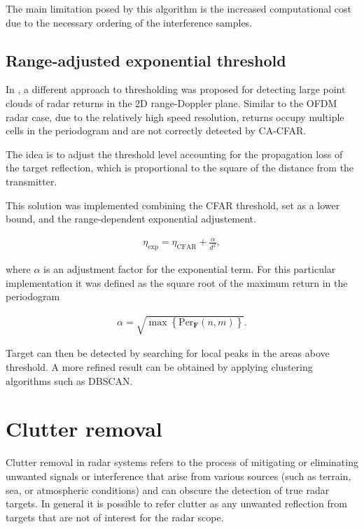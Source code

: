 The main limitation posed by this algorithm is the increased computational cost due to the necessary ordering of the interference samples.


\subsection{Range-adjusted exponential threshold}

	
	In \cite{Wagner_Feger_Stelzer_2017}, a different approach to thresholding was proposed for detecting large point clouds of radar returns in the 2D range-Doppler plane. Similar to the OFDM radar case, due to the relatively high speed resolution, returns occupy multiple cells in the periodogram and are not correctly detected by CA-CFAR.
	
	The idea is to adjust the threshold level accounting for the propagation loss of the target reflection, which is proportional to the square of the distance from the transmitter. 
	
	This solution was implemented combining the CFAR threshold, set as a lower bound, and the range-dependent exponential adjustement.
	
	\begin{align}
		\eta_{\text{exp}} = \eta_{\text{CFAR}} + \frac{\alpha}{d^2},
	\end{align} 
	
	where $\alpha$ is an adjustment factor for the exponential term. For this particular implementation it was defined as the square root of the maximum return in the periodogram
	
	\begin{align}
		\alpha = \sqrt{\max{ \left\{\text{Per}_{\bm{F}}(n,m)\right\} }}.
	\end{align}
	
	
	Target can then be detected by searching for local peaks in the areas above threshold. A more refined result can be obtained by applying clustering algorithms such as DBSCAN.

\section{Clutter removal}
\label{sec:clutter_removal}

	Clutter removal in radar systems refers to the process of mitigating or eliminating unwanted signals or interference that arise from various sources (such as terrain, sea, or atmospheric conditions) and can obscure the detection of true radar targets.
	In general it is possible to refer clutter as any unwanted reflection from targets that are not of interest for the radar scope.
	
